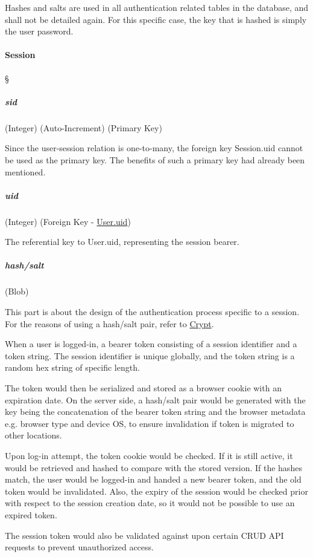 Hashes and salts are used in all authentication related tables in the database, and
shall not be detailed again. For this specific case, the key that is hashed is simply
the user password.

\paragraph{Session}
\S{} \label{data-layer.design.user.tables.sess}

\subparagraph{sid}
(Integer) (Auto-Increment) (Primary Key) \label{data-layer.design.user.tables.sess.sid}

Since the user-session relation is one-to-many, the foreign key Session.uid cannot
be used as the primary key. The benefits of such a primary key had already been
mentioned.

\subparagraph{uid}
(Integer) (Foreign Key -
\hyperref[data-layer.design.user.tables.user.uid]{User.uid}) \label{data-layer.design.user.tables.sess.uid}

The referential key to User.uid, representing the session bearer.

\subparagraph{hash/salt}
(Blob) \label{data-layer.design.user.tables.sess.crypt}

This part is about the design of the authentication process specific to a session.
For the reasons of using a hash/salt pair, refer to \hyperref[data-layer.design.user.tables.pswd.crypt]{Crypt}.

When a user is logged-in, a bearer token consisting of a session identifier and
a token string. The session identifier is unique globally, and the token string
is a random hex string of specific length.

The token would then be serialized and stored as a browser cookie with an
expiration date. On the server side, a hash/salt pair would be generated with
the key being the concatenation of the bearer token string and the browser
metadata e.g. browser type and device OS, to ensure invalidation if token is
migrated to other locations.

Upon log-in attempt, the token cookie would be checked. If it is still active, it
would be retrieved and hashed to compare with the stored version. If the hashes
match, the user would be logged-in and handed a new bearer token, and the old
token would be invalidated. Also, the expiry of the session would be checked
prior with respect to the session creation date, so it would not be possible to use
an expired token.

The session token would also be validated against upon certain CRUD API requests
to prevent unauthorized access.

